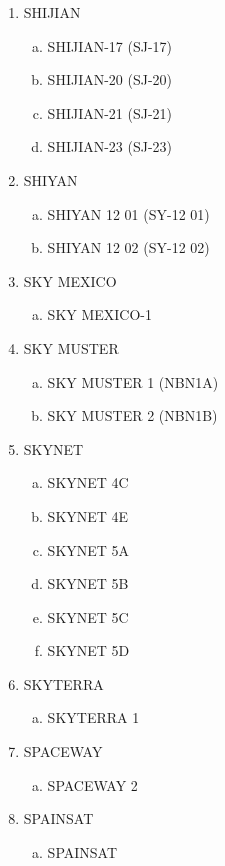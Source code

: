 \begin{multicols}{2}
\begin{enumerate}
  \item SHIJIAN
  \begin{enumerate}[a.]
    \item SHIJIAN-17 (SJ-17)
    \item SHIJIAN-20 (SJ-20)
    \item SHIJIAN-21 (SJ-21)
    \item SHIJIAN-23 (SJ-23)
  \end{enumerate}
  \item SHIYAN
  \begin{enumerate}[a.]
    \item SHIYAN 12 01 (SY-12 01)
    \item SHIYAN 12 02 (SY-12 02)
  \end{enumerate}
  \item SKY MEXICO
  \begin{enumerate}[a.]
    \item SKY MEXICO-1
  \end{enumerate}
  \item SKY MUSTER
  \begin{enumerate}[a.]
    \item SKY MUSTER 1 (NBN1A)
    \item SKY MUSTER 2 (NBN1B)
  \end{enumerate}
  \item SKYNET
  \begin{enumerate}[a.]
    \item SKYNET 4C
    \item SKYNET 4E
    \item SKYNET 5A
    \item SKYNET 5B
    \item SKYNET 5C
    \item SKYNET 5D
  \end{enumerate}
  \item SKYTERRA
  \begin{enumerate}[a.]
    \item SKYTERRA 1
  \end{enumerate}
  \item SPACEWAY
  \begin{enumerate}[a.]
    \item SPACEWAY 2
  \end{enumerate}
  \item SPAINSAT
  \begin{enumerate}[a.]
    \item SPAINSAT
  \end{enumerate}

\end{enumerate}
\end{multicols}
